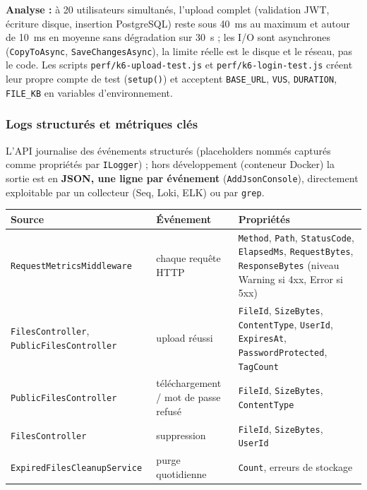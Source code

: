 \documentclass[12pt,a4paper]{article}
\begin{document}
\textbf{Analyse :} \`a 20 utilisateurs simultan\'es, l'upload complet (validation JWT, \'ecriture disque, insertion PostgreSQL) reste sous 40~ms au maximum et autour de 10~ms en moyenne sans d\'egradation sur 30~s ; les I/O sont asynchrones (\texttt{CopyToAsync}, \texttt{SaveChangesAsync}), la limite r\'eelle est le disque et le r\'eseau, pas le code. Les scripts \texttt{perf/k6-upload-test.js} et \texttt{perf/k6-login-test.js} cr\'eent leur propre compte de test (\texttt{setup()}) et acceptent \texttt{BASE\_URL}, \texttt{VUS}, \texttt{DURATION}, \texttt{FILE\_KB} en variables d'environnement.

\subsubsection{Logs structur\'es et m\'etriques cl\'es}
\label{sec:logs}

L'API journalise des \'ev\'enements structur\'es (placeholders nomm\'es captur\'es comme propri\'et\'es par \texttt{ILogger}) ; hors d\'eveloppement (conteneur Docker) la sortie est en \textbf{JSON, une ligne par \'ev\'enement} (\texttt{AddJsonConsole}), directement exploitable par un collecteur (Seq, Loki, ELK) ou par \texttt{grep}.

\begin{longtable}{p{4.2cm} p{3.3cm} p{6.5cm}}
\toprule
\textbf{Source} & \textbf{\'Ev\'enement} & \textbf{Propri\'et\'es} \\
\midrule
\endhead
\texttt{RequestMetricsMiddleware} & chaque requ\^ete HTTP & \texttt{Method}, \texttt{Path}, \texttt{StatusCode}, \texttt{ElapsedMs}, \texttt{RequestBytes}, \texttt{ResponseBytes} (niveau Warning si 4xx, Error si 5xx) \\
\texttt{FilesController}, \texttt{PublicFilesController} & upload r\'eussi & \texttt{FileId}, \texttt{SizeBytes}, \texttt{ContentType}, \texttt{UserId}, \texttt{ExpiresAt}, \texttt{PasswordProtected}, \texttt{TagCount} \\
\texttt{PublicFilesController} & t\'el\'echargement / mot de passe refus\'e & \texttt{FileId}, \texttt{SizeBytes}, \texttt{ContentType} \\
\texttt{FilesController} & suppression & \texttt{FileId}, \texttt{SizeBytes}, \texttt{UserId} \\
\texttt{ExpiredFilesCleanupService} & purge quotidienne & \texttt{Count}, erreurs de stockage \\
\bottomrule
\end{longtable}
\end{document}
